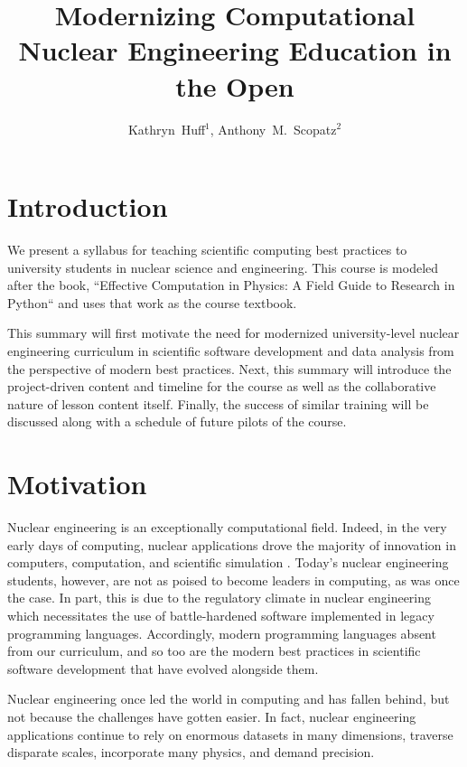 \documentclass{anstrans}
\title{Modernizing Computational Nuclear Engineering Education in the Open}
\author{Kathryn~Huff$^{1}$, Anthony~M.~Scopatz$^{2}$}
\institute{
$^{1}$ The University of California -- Berkeley, Berkeley, CA 94709 \\
\and $^{2}$ The University of South Carolina, Columbia, SC 29208 \\
}
\begin{document}
\section{Introduction}

We present a syllabus for teaching scientific computing best practices to
university students in nuclear science and engineering.  This course is modeled after the
book, ``Effective Computation in Physics: A Field Guide to Research in
Python`` \cite{scopatz_effective_2015} and uses that work as the course
textbook.

This summary will first motivate the need for modernized university-level nuclear
engineering curriculum in scientific software development and data analysis
from the perspective of modern best practices.  Next, this summary will introduce
the project-driven content and timeline for the course as well as the
collaborative nature of lesson content itself. Finally, the success of
similar training will be discussed along with a schedule of future pilots of
the course.

\section{Motivation}

Nuclear engineering is an exceptionally computational field. Indeed, in the very early
days of computing,  nuclear applications drove the majority of innovation
in computers, computation, and scientific simulation \cite{rhodes_making_2012}. Today's nuclear
engineering students, however, are not as poised to become leaders in computing,
as was once the case.
In part, this is due to the regulatory climate in nuclear engineering which
necessitates the use of battle-hardened software implemented in legacy
programming languages. Accordingly, modern programming languages absent from
our curriculum, and so too are the modern
best practices in scientific software development \cite{wilson_best_2014} that
have evolved alongside them.

Nuclear engineering once led the world in computing and has fallen behind, but
not because the challenges have gotten easier. In fact, nuclear engineering
applications continue to rely on enormous datasets in many
dimensions, traverse disparate scales, incorporate many physics, and demand
precision.

\end{document}
